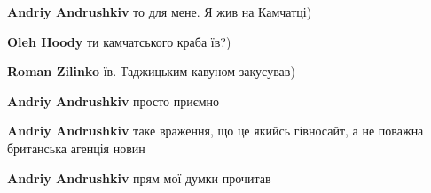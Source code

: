 \begin{itemize}
\begin{itemize}
\textbf{Andriy Andrushkiv} то для мене. Я жив на Камчатці)

\begin{itemize}
 
\textbf{Oleh Hoody} ти камчатського краба їв?)

 
\textbf{Roman Zilinko} їв. Таджицьким кавуном закусував)
\end{itemize}	

\end{itemize}

 
\textbf{Andriy Andrushkiv} просто приємно

 
\textbf{Andriy Andrushkiv} таке враження, що це якийсь гівносайт, а не поважна британська агенція новин

 
\textbf{Andriy Andrushkiv} прям мої думки прочитав \Smiley[1.0][yellow]

 

\end{itemize}
